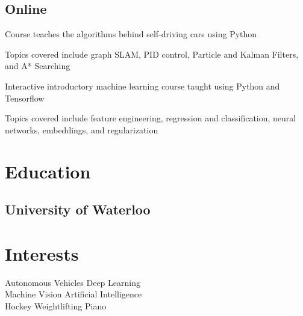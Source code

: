 \documentclass[]{deedy-resume-openfont}
\begin{document}
\begin{minipage}[t]{0.33\textwidth}
\subsection{Online}
\begin{tightemize}
\item Course teaches the algorithms behind self-driving cars using Python
\item Topics covered include graph SLAM, PID control, Particle and Kalman Filters, and A* Searching
\end{tightemize}

\begin{tightemize}
\item Interactive introductory machine learning course taught using Python and Tensorflow
\item Topics covered include feature engineering, regression and classification, neural networks, embeddings, and regularization
\end{tightemize}

\sectionsep


\section{Education} 

\subsection{University of Waterloo}
\sectionsep



\section{Interests}
Autonomous Vehicles \textbullet{} Deep Learning \\ \textbullet{} Machine Vision \textbullet{} Artificial Intelligence \\ \textbullet{} Hockey \textbullet{} Weightlifting \textbullet{} Piano

%
%

\end{minipage} 
\end{document}
